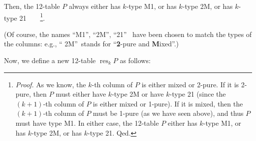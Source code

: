 \documentclass[numbers=enddot,12pt,final,onecolumn,notitlepage]{scrartcl}%
\theoremstyle{definition}
\newenvironment{vershort}{}{}
\begin{document}
\begin{vershort}
Then, the 12-table $P$ always either has $k$-type M1, or has $k$-type 2M, or
has $k$-type 21\ \ \ \ \footnote{\textit{Proof.} As we know, the $k$-th column
of $P$ is either mixed or 2-pure. If it is 2-pure, then $P$ must either have
$k$-type 2M or have $k$-type 21 (since the $\left(  k+1\right)  $-th column of
$P$ is either mixed or 1-pure). If it is mixed, then the $\left(  k+1\right)
$-th column of $P$ must be 1-pure (as we have seen above), and thus $P$ must
have type M1. In either case, the 12-table $P$ either has $k$-type M1, or has
$k$-type 2M, or has $k$-type 21. Qed.}.

(Of course, the names \textquotedblleft M1\textquotedblright,
\textquotedblleft2M\textquotedblright, \textquotedblleft21\textquotedblright%
\ have been chosen to match the types of the columns: e.g., \textquotedblleft%
2M\textquotedblright\ stands for \textquotedblleft\textbf{2}-pure and
\textbf{M}ixed\textquotedblright.)

Now, we define a new 12-table $\operatorname*{res}\nolimits_{k}P$ as follows:


\end{vershort}
\end{document}
